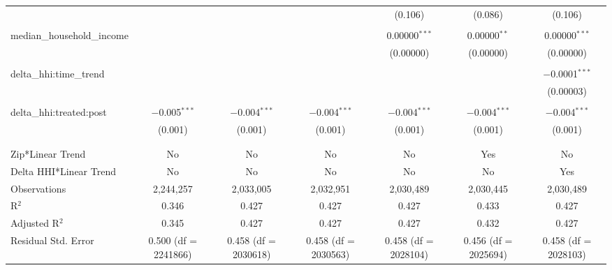 \begin{table}[H]
{\begin{tabular}{@{\extracolsep{5pt}}lcccccc}
   &  &  &  & (0.106) & (0.086) & (0.106) \\  

   & & & & & & \\  

  median\_household\_income &  &  &  & 0.00000$^{***}$ & 0.00000$^{**}$ & 0.00000$^{***}$ \\  

   &  &  &  & (0.00000) & (0.00000) & (0.00000) \\  

   & & & & & & \\  

  delta\_hhi:time\_trend &  &  &  &  &  & $-$0.0001$^{***}$ \\  

   &  &  &  &  &  & (0.00003) \\  

   & & & & & & \\  

  delta\_hhi:treated:post & $-$0.005$^{***}$ & $-$0.004$^{***}$ & $-$0.004$^{***}$ & $-$0.004$^{***}$ & $-$0.004$^{***}$ & $-$0.004$^{***}$ \\  

   & (0.001) & (0.001) & (0.001) & (0.001) & (0.001) & (0.001) \\  

   & & & & & & \\  

 \hline \\[-1.8ex]  

 Zip*Linear Trend & No & No & No & No & Yes & No \\  

 Delta HHI*Linear Trend & No & No & No & No & No & Yes \\  

 Observations & 2,244,257 & 2,033,005 & 2,032,951 & 2,030,489 & 2,030,445 & 2,030,489 \\  

 R$^{2}$ & 0.346 & 0.427 & 0.427 & 0.427 & 0.433 & 0.427 \\  

 Adjusted R$^{2}$ & 0.345 & 0.427 & 0.427 & 0.427 & 0.432 & 0.427 \\  

 Residual Std. Error & 0.500 (df = 2241866) & 0.458 (df = 2030618) & 0.458 (df = 2030563) & 0.458 (df = 2028104) & 0.456 (df = 2025694) & 0.458 (df = 2028103) \\  

 \hline  


\end{tabular}}
\end{table}
